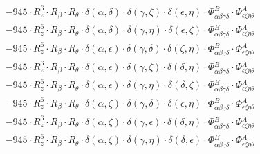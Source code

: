\documentclass{article}
\begin{document}
\begin{equation}
\begin{array}{c}
 \\[0.2em] 		 - 945 \cdot R_{z}^{6} \cdot R_{\beta{}} \cdot R_{\theta{}} \cdot \delta{}\left(\alpha{}, \delta{}\right) \cdot \delta{}\left(\gamma{}, \zeta{}\right) \cdot \delta{}\left(\epsilon{}, \eta{}\right) \cdot \Phi{}^{B}_{\alpha{}\beta{}\gamma{}\delta{}} \cdot \Phi{}^{A}_{\epsilon{}\zeta{}\eta{}\theta{}} 
 \\[0.2em] 		 - 945 \cdot R_{z}^{6} \cdot R_{\beta{}} \cdot R_{\theta{}} \cdot \delta{}\left(\alpha{}, \delta{}\right) \cdot \delta{}\left(\gamma{}, \eta{}\right) \cdot \delta{}\left(\epsilon{}, \zeta{}\right) \cdot \Phi{}^{B}_{\alpha{}\beta{}\gamma{}\delta{}} \cdot \Phi{}^{A}_{\epsilon{}\zeta{}\eta{}\theta{}} 
 \\[0.2em] 		 - 945 \cdot R_{z}^{6} \cdot R_{\beta{}} \cdot R_{\theta{}} \cdot \delta{}\left(\alpha{}, \epsilon{}\right) \cdot \delta{}\left(\gamma{}, \delta{}\right) \cdot \delta{}\left(\zeta{}, \eta{}\right) \cdot \Phi{}^{B}_{\alpha{}\beta{}\gamma{}\delta{}} \cdot \Phi{}^{A}_{\epsilon{}\zeta{}\eta{}\theta{}} 
 \\[0.2em] 		 - 945 \cdot R_{z}^{6} \cdot R_{\beta{}} \cdot R_{\theta{}} \cdot \delta{}\left(\alpha{}, \epsilon{}\right) \cdot \delta{}\left(\gamma{}, \zeta{}\right) \cdot \delta{}\left(\delta{}, \eta{}\right) \cdot \Phi{}^{B}_{\alpha{}\beta{}\gamma{}\delta{}} \cdot \Phi{}^{A}_{\epsilon{}\zeta{}\eta{}\theta{}} 
 \\[0.2em] 		 - 945 \cdot R_{z}^{6} \cdot R_{\beta{}} \cdot R_{\theta{}} \cdot \delta{}\left(\alpha{}, \epsilon{}\right) \cdot \delta{}\left(\gamma{}, \eta{}\right) \cdot \delta{}\left(\delta{}, \zeta{}\right) \cdot \Phi{}^{B}_{\alpha{}\beta{}\gamma{}\delta{}} \cdot \Phi{}^{A}_{\epsilon{}\zeta{}\eta{}\theta{}} 
 \\[0.2em] 		 - 945 \cdot R_{z}^{6} \cdot R_{\beta{}} \cdot R_{\theta{}} \cdot \delta{}\left(\alpha{}, \zeta{}\right) \cdot \delta{}\left(\gamma{}, \delta{}\right) \cdot \delta{}\left(\epsilon{}, \eta{}\right) \cdot \Phi{}^{B}_{\alpha{}\beta{}\gamma{}\delta{}} \cdot \Phi{}^{A}_{\epsilon{}\zeta{}\eta{}\theta{}} 
 \\[0.2em] 		 - 945 \cdot R_{z}^{6} \cdot R_{\beta{}} \cdot R_{\theta{}} \cdot \delta{}\left(\alpha{}, \zeta{}\right) \cdot \delta{}\left(\gamma{}, \epsilon{}\right) \cdot \delta{}\left(\delta{}, \eta{}\right) \cdot \Phi{}^{B}_{\alpha{}\beta{}\gamma{}\delta{}} \cdot \Phi{}^{A}_{\epsilon{}\zeta{}\eta{}\theta{}} 
 \\[0.2em] 		 - 945 \cdot R_{z}^{6} \cdot R_{\beta{}} \cdot R_{\theta{}} \cdot \delta{}\left(\alpha{}, \zeta{}\right) \cdot \delta{}\left(\gamma{}, \eta{}\right) \cdot \delta{}\left(\delta{}, \epsilon{}\right) \cdot \Phi{}^{B}_{\alpha{}\beta{}\gamma{}\delta{}} \cdot \Phi{}^{A}_{\epsilon{}\zeta{}\eta{}\theta{}} 

\end{array}
\end{equation}
\end{document}
